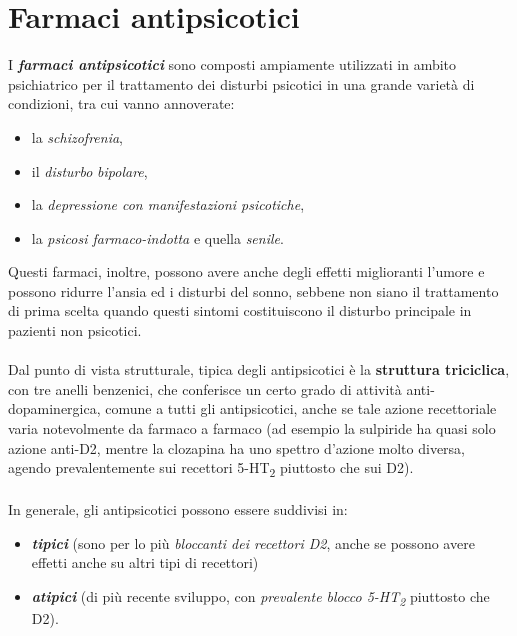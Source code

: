 \section{Farmaci antipsicotici}

I \textbf{\emph{farmaci antipsicotici}} sono composti ampiamente
utilizzati in ambito psichiatrico per il trattamento dei disturbi
psicotici in una grande varietà di condizioni, tra cui vanno annoverate:

\begin{itemize}
\item
  la \emph{schizofrenia},
\item
  il \emph{disturbo} \emph{bipolare},
\item
  la \emph{depressione con manifestazioni psicotiche},
\item
  la \emph{psicosi farmaco-indotta} e quella \emph{senile}.
\end{itemize}

Questi farmaci, inoltre, possono avere anche degli effetti miglioranti
l'umore e possono ridurre l'ansia ed i disturbi del sonno, sebbene non
siano il trattamento di prima scelta quando questi sintomi costituiscono
il disturbo principale in pazienti non psicotici.
\\\\
Dal punto di vista strutturale, tipica degli antipsicotici è la
\textbf{struttura triciclica}, con tre anelli benzenici, che conferisce
un certo grado di attività anti-dopaminergica, comune a tutti gli
antipsicotici, anche se tale azione recettoriale varia notevolmente da
farmaco a farmaco (ad esempio la sulpiride ha quasi solo azione anti-D2,
mentre la clozapina ha uno spettro d'azione molto diversa, agendo
prevalentemente sui recettori 5-HT\textsubscript{2} piuttosto che sui
D2).
\\\\
In generale, gli antipsicotici possono essere suddivisi in:

\begin{itemize}
\item
  \textbf{\emph{tipici}} (sono per lo più \emph{bloccanti dei recettori
  D2}, anche se possono avere effetti anche su altri tipi di recettori)
\item
  \textbf{\emph{atipici}} (di più recente sviluppo, con \emph{prevalente
  blocco 5-HT\textsubscript{2}} piuttosto che D2).
\end{itemize}

